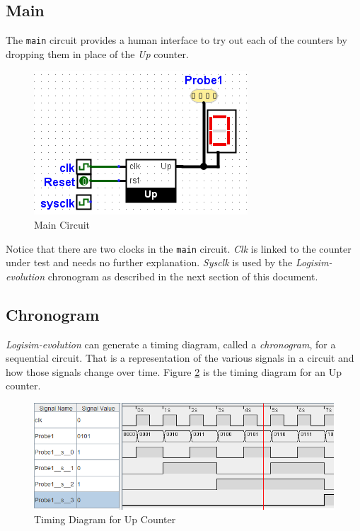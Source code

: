 \subsection{Main}

The \lstinline[columns=fixed]|main| circuit provides a human interface to try out each of the counters by dropping them in place of the \textit{Up} counter.

\begin{figure}[H]
	\centering
	\includegraphics[width=\maxwidth{.95\linewidth}]{gfx/06-06}
	\caption{Main Circuit}
	\label{fig:06-06}
\end{figure}

Notice that there are two clocks in the \lstinline[columns=fixed]|main| circuit. \textit{Clk} is linked to the counter under test and needs no further explanation. \textit{Sysclk} is used by the \textit{Logisim-evolution} chronogram as described in the next section of this document.

\subsection{Chronogram}

\textit{Logisim-evolution} can generate a timing diagram, called a \textit{chronogram}, for a sequential circuit. That is a representation of the various signals in a circuit and how those signals change over time. Figure \ref{fig:06-07} is the timing diagram for an Up counter.

\begin{figure}[H]
	\centering
	\includegraphics[width=\maxwidth{.95\linewidth}]{gfx/06-07}
	\caption{Timing Diagram for Up Counter}
	\label{fig:06-07}
\end{figure}

